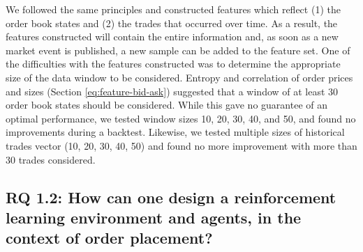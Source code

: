 We followed the same principles and constructed features which reflect (1) the order book states and (2) the trades that occurred over time.
As a result, the features constructed will contain the entire information and, as soon as a new market event is published, a new sample can be added to the feature set.
One of the difficulties with the features constructed was to determine the appropriate size of the data window to be considered.
Entropy and correlation of order prices and sizes (Section \ref{eq:feature-bid-ask}) suggested that a window of at least 30 order book states should be considered.
While this gave no guarantee of an optimal performance, we tested window sizes 10, 20, 30, 40, and 50, and found no improvements during a backtest.
Likewise, we tested multiple sizes of historical trades vector (10, 20, 30, 40, 50) and found no more improvement with more than 30 trades considered.

\subsection{RQ 1.2: How can one design a reinforcement learning environment and agents, in the context of order placement?}

